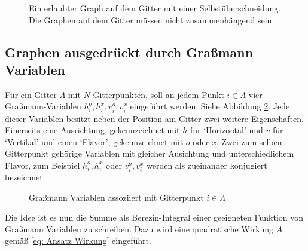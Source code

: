 \begin{figure}
    \centering
    
    \caption{Ein erlaubter Graph auf dem Gitter mit einer Selbstüberschneidung. Die Graphen auf dem Gitter müssen nicht zusammenhängend sein.}
    \label{Abb: erlaubte Graphen}
\end{figure}

\subsection{Graphen ausgedrückt durch Graßmann Variablen } \label{sec: GraßmanGraphs}

\noindent Für ein Gitter $\Lambda$ mit $N$ Gitterpunkten, soll an jedem Punkt $i \in \Lambda$ vier Graßmann-Variablen $h_{i}^o, h_{i}^x, v_{i}^o, v_{i}^x$ eingeführt werden. Siehe Abbildung \ref{Abb: graßmanVariableBeiI}. Jede dieser Variablen besitzt neben der Position am Gitter zwei weitere Eigenschaften. Einerseits eine Ausrichtung, gekennzeichnet mit $h$ für `Horizontal' und $v$ für `Vertikal' und einen `Flavor', gekennzeichnet mit $o$ oder $x$. Zwei zum selben Gitterpunkt gehörige Variablen mit gleicher Ausichtung und unterschiedlichem Flavor, zum Beispiel  $h_{i}^o, h_{i}^x $ oder $ v_{i}^o, v_{i}^x$ werden als zueinander konjugiert bezeichnet.

\begin{figure}
\centering
{}
\caption{Graßmann Variablen assoziiert mit Gitterpunkt $i\in\Lambda$}
\label{Abb: graßmanVariableBeiI}
\end{figure}

\noindent Die Idee ist es nun die Summe als Berezin-Integral einer geeigneten Funktion von Graßmann Variablen zu schreiben. Dazu wird eine quadratische Wirkung $A$ gemäß \eqref{eq: Ansatz Wirkung} eingeführt.  

